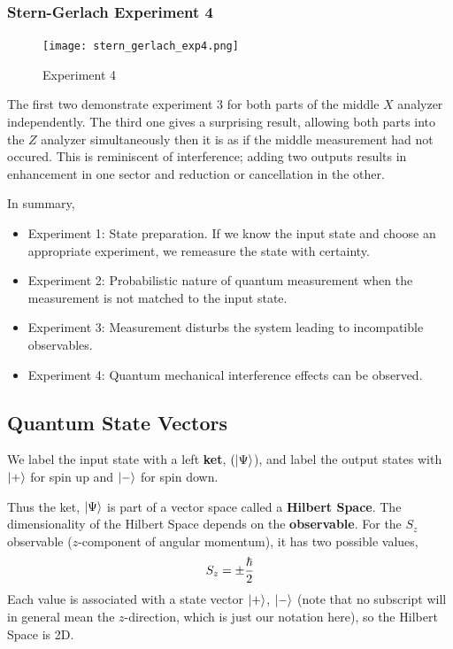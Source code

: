 \documentclass[english, 11pt]{article}
\begin{document}
      \subsubsection{Stern-Gerlach Experiment 4}

         \begin{figure}[t!]
            \centering
            \texttt{[image: stern\_gerlach\_exp4.png]}
            \caption{Experiment 4}
         \end{figure}

         The first two demonstrate experiment 3 for both parts of the middle $X$ analyzer independently. The third one gives a surprising result, allowing both parts into the $Z$ analyzer simultaneously then it is as if the middle measurement had not occured. This is reminiscent of interference; adding two outputs results in enhancement in one sector and reduction or cancellation in the other.
         \newline

       In summary,

       \begin{itemize}
         \item Experiment 1: State preparation. If we know the input state and choose an appropriate experiment, we remeasure the state with certainty.
         \item Experiment 2: Probabilistic nature of quantum measurement when the measurement is not matched to the input state.
         \item Experiment 3: Measurement disturbs the system leading to incompatible observables.
         \item Experiment 4: Quantum mechanical interference effects can be observed.
       \end{itemize}

       \subsection{Quantum State Vectors}

         \begin{defn}[Postulate 1]\label{postulate_1}
         We label the input state with a left \textbf{ket}, $(\left|\Psi\right\rangle$), and label the output states with $\left|+\right\rangle$ for spin up and $\left|-\right\rangle$ for spin down.
         \end{defn}

         Thus the ket, $\left|\Psi\right\rangle$ is part of a vector space called a \textbf{Hilbert Space}. The dimensionality of the Hilbert Space depends on the \textbf{observable}. For the $S_z$ observable ($z$-component of angular momentum), it has two possible values,
         \[ S_z = \pm \frac{\hbar}{2} \]
         Each value is associated with a state vector $\left|+\right\rangle$, $\left|-\right\rangle$ (note that no subscript will in general mean the $z$-direction, which is just our notation here), so the Hilbert Space is 2D.
\end{document}
